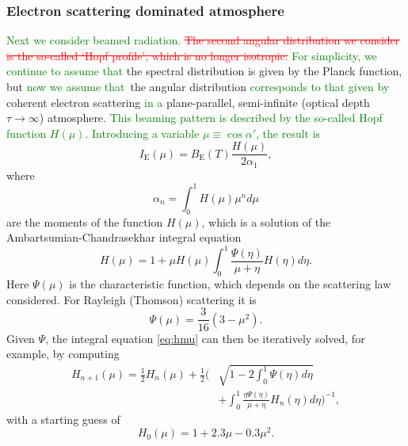 \documentclass{aa}
\newcommand{\refe}[1]{\textcolor{green}{{#1}}}
\newcommand{\refedel}[1]{\textcolor{red}{\sout{#1}}}
\begin{document}
\subsubsection{Electron scattering dominated atmosphere}

\refe{Next we consider beamed radiation.}
\refedel{The second angular distribution we consider is the so-called `Hopf profile', which is no longer isotropic.}
\refe{For simplicity, we continue to assume that} the spectral distribution is given by the Planck function, but \refe{now we assume that} the angular distribution \refe{corresponds to that given by} coherent electron scattering \refe{in a} plane-parallel, semi-infinite (optical depth $\tau \rightarrow \infty$) atmosphere.
\refe{This beaming pattern is described by the so-called Hopf function $H(\mu)$.}
\refe{Introducing a variable $\mu \equiv \cos\alpha'$, the result is}
\begin{equation}\label{eq:hopf}
  I_{\mathrm{E}}(\mu) = B_{\mathrm{E}}(T) \frac{H(\mu)}{2\alpha_1},
\end{equation}
where
\begin{equation}
  \alpha_n = \int_0^1 H(\mu) \mu^n d\mu
\end{equation}
are the moments of the function $H(\mu)$, which is a solution of the Ambartsumian-Chandrasekhar integral equation \citep[see e.g.][]{Cha60,Sob63}
\begin{equation}\label{eq:hmu}
  H(\mu) = 1 + \mu H(\mu) \int_0^1 \frac{\Psi(\eta)}{\mu + \eta} H(\eta) d\eta.
\end{equation}
Here $\Psi(\mu)$ is the characteristic function, which depends on the scattering law considered.
For Rayleigh (Thomson) scattering it is
\begin{equation}
  \Psi(\mu) = \frac{3}{16}(3-\mu^2).
\end{equation}
Given $\Psi$, the integral equation \eqref{eq:hmu} can then be iteratively solved, for example, by computing
\begin{equation}\begin{split}
    H_{n+1}(\mu) =  \frac{1}{2} H_n(\mu) + \frac{1}{2}\Biggl(& \sqrt{1-2\int_0^1 \Psi(\eta)d\eta} \\
                    &+ \int_0^1 \frac{\eta \Psi(\eta)}{\mu + \eta} H_n(\eta) d\eta \Biggr)^{-1},
\end{split}\end{equation}
with a starting guess of
\begin{equation}\label{eq:apprx_hopf}
  H_0(\mu) = 1 + 2.3\mu - 0.3\mu^2.
\end{equation}
\end{document}
